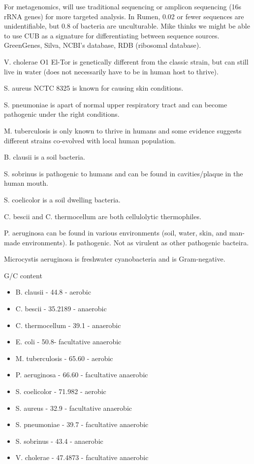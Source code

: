 \documentclass[11pt]{labbook}
\begin{document}
For metagenomics, will use traditional sequencing or amplicon sequencing (16s rRNA genes) for more targeted analysis. In Rumen, 0.02 or fewer sequences are unidentifiable, but 0.8 of bacteria are unculturable. Mike thinks we might be able to use CUB as a signature for differentiating between sequence sources. GreenGenes, Silva, NCBI's database, RDB (ribosomal database). 



V. cholerae O1 El-Tor is genetically different from the classic strain, but can still live in water (does not necessarily have to be in human host to thrive).

S. aureus NCTC 8325 is known for causing skin conditions.

S. pneumoniae is apart of normal upper respiratory tract and can become pathogenic under the right conditions.

M. tuberculosis is only known to thrive in humans and some evidence suggests different strains co-evolved with local human population.

B. clausii is a soil bacteria.

S. sobrinus is pathogenic to humans and can be found in cavities/plaque in the human mouth.

S. coelicolor is a soil dwelling bacteria.

C. bescii and C. thermocellum are both cellulolytic thermophiles. 

P. aeruginosa can be found in various environments (soil, water, skin, and man-made environments). Is pathogenic. Not as virulent as other pathogenic bacteira. 

Microcystis aeruginosa is freshwater cyanobacteria and is Gram-negative. 

G/C content
\begin{itemize}
\item B. clausii - 44.8 - aerobic
\item C. bescii - 35.2189 - anaerobic
\item C. thermocellum - 39.1 - anaerobic
\item E. coli - 50.8- facultative anaerobic 
\item M. tuberculosis - 65.60 - aerobic 
\item P. aeruginosa - 66.60 - facultative anaerobic
\item S. coelicolor - 71.982 - aerobic 
\item S. aureus - 32.9 - facultative anaerobic
\item S. pneumoniae - 39.7 - facultative anaerobic
\item S. sobrinus - 43.4 -  anaerobic
\item V. cholerae - 47.4873 - facultative anaerobic
\end{itemize}
\end{document}

